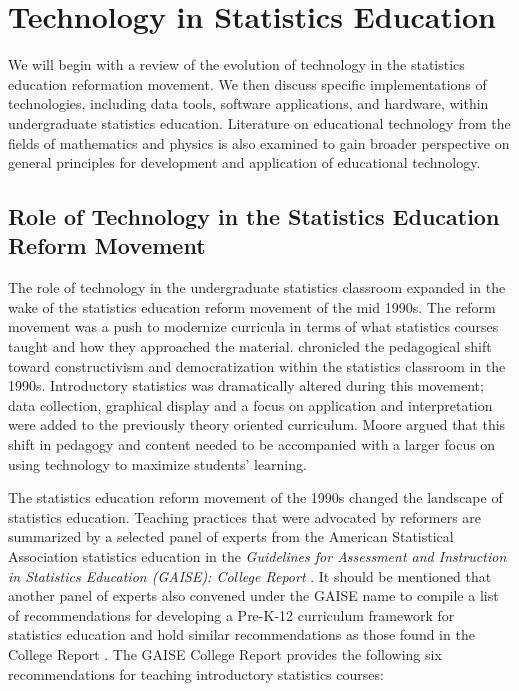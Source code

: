 \section{Technology in Statistics Education}
\label{EdTech}

We will begin with a review of the evolution of technology in the statistics education reformation movement. We then discuss specific implementations of technologies, including data tools, software applications, and hardware, within undergraduate statistics education. Literature on educational technology from the fields of mathematics and physics is also examined to gain broader perspective on general principles for development and application of educational technology.  

\subsection{Role of Technology in the Statistics Education Reform Movement}

The role of technology in the undergraduate statistics classroom expanded in the wake of the statistics education reform movement of the mid 1990s. The reform movement was a push to modernize curricula in terms of  what statistics courses taught and how they approached the material. \citet{Moore1997} chronicled the pedagogical shift toward constructivism and democratization within the statistics classroom in the 1990s. Introductory statistics was dramatically altered during this movement; data collection, graphical display and a focus on application and interpretation were added to the previously theory oriented curriculum. Moore argued that this shift in pedagogy and content needed to be accompanied with a larger focus on using technology to maximize students' learning. 

The statistics education reform movement of the 1990s changed the landscape of statistics education. Teaching practices that were advocated by reformers are summarized by a selected panel of experts from the American Statistical Association statistics education in the \textit{Guidelines for Assessment and Instruction in Statistics Education (GAISE): College Report} \citep{GAISEcollege}. It should be mentioned that another panel of experts also convened under the GAISE name to compile a list of recommendations for developing a Pre-K-12 curriculum framework for statistics education and hold similar recommendations as those found in the College Report \citep{GAISEk12}.  The GAISE College Report provides the following six recommendations for teaching introductory statistics courses:


